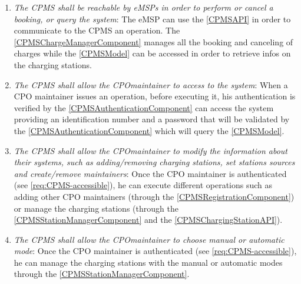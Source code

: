 \begin{enumerate}[label=\textbf{R\arabic*}]
    \label{req:eMSP-set-special-offers}
    \item \textit{The \ac{CPMS} shall be reachable by \acp{eMSP} in order to perform or cancel a booking, or query the system}:
    The \ac{eMSP} can use the \ref{CPMSAPI} in order to communicate to the \ac{CPMS} an operation. The \ref{CPMSChargeManagerComponent} manages all the booking and canceling of charges while the \ref{CPMSModel} can be accessed in order to retrieve infos on the charging stations.
    \label{req:CPMS-reachable}
    \item \textit{The \ac{CPMS} shall allow the \ac{CPO}maintainer to access to the system}:
    When a \ac{CPO} maintainer issues an operation, before executing it, his authentication is verified by the \ref{CPMSAuthenticationComponent} can access the system providing an identification number and a password that will be validated by the \ref{CPMSAuthenticationComponent} which will query the \ref{CPMSModel}.
    \label{req:CPMS-accessible}
    \item \textit{The \ac{CPMS} shall allow the \ac{CPO}maintainer to modify the information about their systems, such as adding/removing charging stations, set stations sources and create/remove maintainers}:
    Once the \ac{CPO} maintainer is authenticated (see \ref{req:CPMS-accessible}), he can execute different operations such as adding other \ac{CPO} maintainers (through the \ref{CPMSRegistrationComponent}) or manage the charging stations (through the \ref{CPMSStationManagerComponent} and the \ref{CPMSChargingStationAPI}).
    \label{req:CPMS-modify-cpo-infos}
    \item \textit{The \ac{CPMS} shall allow the \ac{CPO}maintainer to choose manual or automatic mode}:
    Once the \ac{CPO} maintainer is authenticated (see \ref{req:CPMS-accessible}), he can manage the charging stations with the manual or automatic modes through the \ref{CPMSStationManagerComponent}.
    \label{req:CPMS-select-mode}
\end{enumerate}
\clearpage